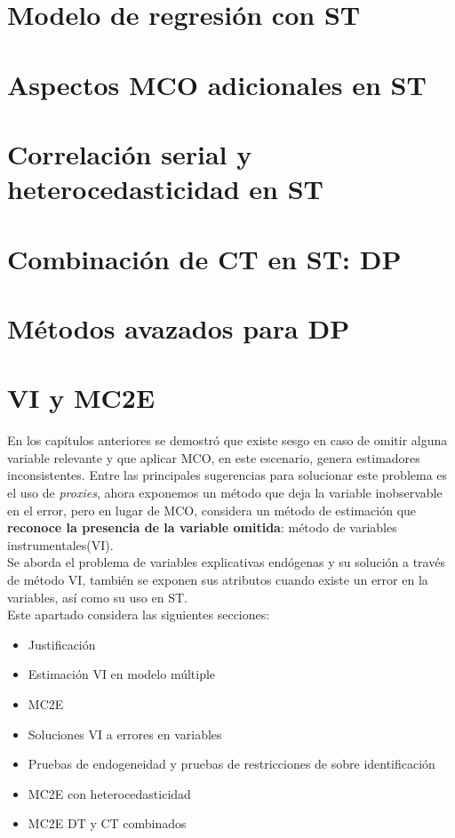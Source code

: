 \documentclass[a4paper,11pt]{book}
\begin{document}
\chapter{Modelo de regresión con ST}
\chapter{Aspectos MCO adicionales en ST}
\chapter{Correlación serial y heterocedasticidad en ST}
\chapter{Combinación de CT en ST: DP}
\chapter{Métodos avazados para DP}
\chapter{VI y MC2E}
En los capítulos anteriores se demostró que existe sesgo en caso de omitir alguna variable relevante y que aplicar MCO, en este escenario, genera estimadores inconsistentes. Entre las principales sugerencias para solucionar este problema es el uso de \textit{proxies}, ahora exponemos un método que deja la variable inobservable en el error, pero en lugar de MCO, considera un método de estimación que \textbf{reconoce la presencia de la variable omitida}: método de variables instrumentales(VI).\\

Se aborda el problema de variables explicativas endógenas y su solución a través de método VI, también se exponen sus atributos cuando existe un error en la variables, así como su uso en ST.\\

Este apartado considera las siguientes secciones:
\begin{itemize}
	\item Justificación
	\item Estimación VI en modelo múltiple
	\item MC2E
	\item Soluciones VI a errores en variables
	\item Pruebas de endogeneidad y pruebas de restricciones de sobre identificación
	\item MC2E con heterocedasticidad
	\item MC2E DT y CT combinados
\end{itemize}
\end{document}
